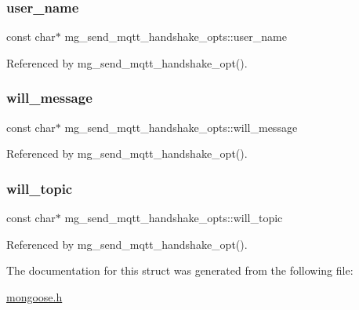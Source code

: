 \subsubsection{\texorpdfstring{user\+\_\+name}{user\_name}}
{\footnotesize\ttfamily const char$\ast$ mg\+\_\+send\+\_\+mqtt\+\_\+handshake\+\_\+opts\+::user\+\_\+name}



Referenced by mg\+\_\+send\+\_\+mqtt\+\_\+handshake\+\_\+opt().

\mbox{\label{structmg__send__mqtt__handshake__opts_a747846d48256c35b24544a1e19321f09_a747846d48256c35b24544a1e19321f09}} 
\subsubsection{\texorpdfstring{will\+\_\+message}{will\_message}}
{\footnotesize\ttfamily const char$\ast$ mg\+\_\+send\+\_\+mqtt\+\_\+handshake\+\_\+opts\+::will\+\_\+message}



Referenced by mg\+\_\+send\+\_\+mqtt\+\_\+handshake\+\_\+opt().

\mbox{\label{structmg__send__mqtt__handshake__opts_a7cdd8f59da7f39ccd8face3e7267d634_a7cdd8f59da7f39ccd8face3e7267d634}} 
\subsubsection{\texorpdfstring{will\+\_\+topic}{will\_topic}}
{\footnotesize\ttfamily const char$\ast$ mg\+\_\+send\+\_\+mqtt\+\_\+handshake\+\_\+opts\+::will\+\_\+topic}



Referenced by mg\+\_\+send\+\_\+mqtt\+\_\+handshake\+\_\+opt().



The documentation for this struct was generated from the following file\+:\begin{DoxyCompactItemize}
\item 
\hyperlink{mongoose_8h}{mongoose.\+h}\end{DoxyCompactItemize}
